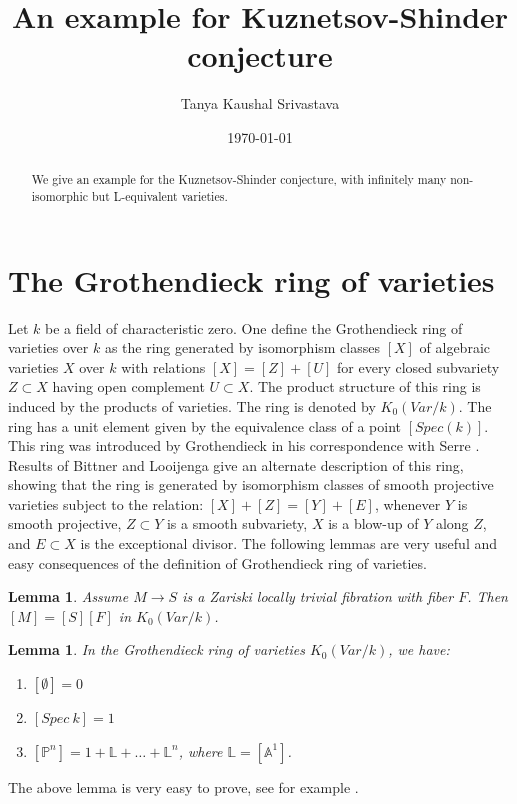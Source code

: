 \documentclass[a4, 11pt]{amsart}
\title{An example for Kuznetsov-Shinder conjecture}
\author{Tanya Kaushal Srivastava}
\date{\today}
\newtheorem{lemma}[theorem]{\sf Lemma}
\def \P{\mathbb P}
\def \L{\mathbb L}
\def \ra{\rightarrow}
\def \ra{\rightarrow}
\begin{document}
\maketitle
\begin{abstract}
    We give an example for the Kuznetsov-Shinder conjecture, with infinitely many non-isomorphic but L-equivalent varieties.
\end{abstract}

\section{The Grothendieck ring of varieties}


Let $k$ be a field of characteristic zero. One define the Grothendieck ring of varieties over $k$ as the ring generated by isomorphism classes $[X]$ of algebraic varieties $X$ over $k$ with relations $[X]=[Z]+[U]$ for every closed subvariety $Z \subset X$ having open complement $U \subset X$. The product structure of this ring is induced by the products of varieties. The ring is denoted by $K_0(Var/k)$. The ring has a unit element given by the equivalence class of a point $[Spec (k)]$. This ring was introduced by Grothendieck in his correspondence with Serre \cite{Grothendieck-serre}. Results of Bittner \cite{Bittner} and Looijenga \cite{Looi} give an alternate description of this ring, showing that the ring is generated by isomorphism classes of smooth projective varieties subject to the relation: $[X] + [Z] = [Y] + [E]$, whenever $Y$ is smooth projective, $Z \subset Y$ is a smooth subvariety, $X$ is a blow-up of $Y$ along $Z$, and $E \subset X$ is the exceptional divisor. The following lemmas are very useful and  easy consequences of the definition of Grothendieck ring of varieties. 

\begin{lemma} \cite[Lemma 2.1]{KS}
    Assume $M \ra S$ is a Zariski locally trivial fibration with fiber $F$. Then $[M]=[S][F]$ in $K_0(Var/k)$. 
\end{lemma}
    
\begin{lemma} \label{lemma2}
   In the Grothendieck ring of varieties $K_0(Var/k)$, we have: 
   \begin{enumerate}
       \item $[\emptyset] = 0$
       \item $[Spec \ k] = 1$
       \item $[\P^n]= 1 + \L + \ldots + \L^n$, where $\L= [\mathbb{A}^1]$.
   \end{enumerate}
\end{lemma}
The above lemma is very easy to prove, see for example \cite{Kap}.
\end{document}
